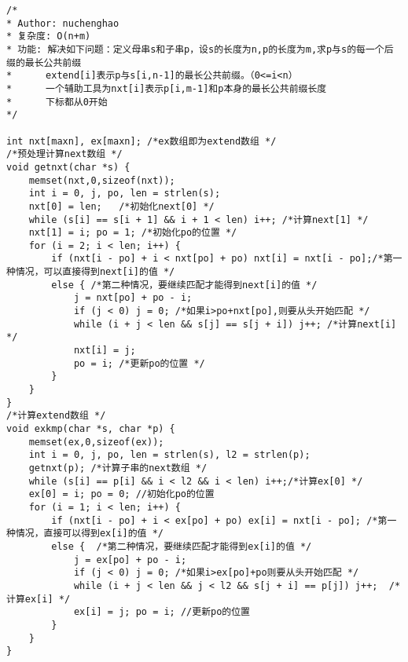 \begin{lstlisting}
/*
* Author: nuchenghao
* 复杂度: O(n+m)
* 功能: 解决如下问题：定义母串s和子串p，设s的长度为n,p的长度为m,求p与s的每一个后缀的最长公共前缀
*      extend[i]表示p与s[i,n-1]的最长公共前缀。（0<=i<n）
*      一个辅助工具为nxt[i]表示p[i,m-1]和p本身的最长公共前缀长度
*      下标都从0开始
*/

int nxt[maxn], ex[maxn]; /*ex数组即为extend数组 */
/*预处理计算next数组 */
void getnxt(char *s) {
	memset(nxt,0,sizeof(nxt));
	int i = 0, j, po, len = strlen(s);
	nxt[0] = len;   /*初始化next[0] */
	while (s[i] == s[i + 1] && i + 1 < len) i++; /*计算next[1] */
	nxt[1] = i; po = 1; /*初始化po的位置 */
	for (i = 2; i < len; i++) {
		if (nxt[i - po] + i < nxt[po] + po) nxt[i] = nxt[i - po];/*第一种情况，可以直接得到next[i]的值 */
		else { /*第二种情况，要继续匹配才能得到next[i]的值 */
			j = nxt[po] + po - i;
			if (j < 0) j = 0; /*如果i>po+nxt[po],则要从头开始匹配 */
			while (i + j < len && s[j] == s[j + i]) j++; /*计算next[i] */
			nxt[i] = j;
			po = i; /*更新po的位置 */
		}
	}
}
/*计算extend数组 */
void exkmp(char *s, char *p) {
	memset(ex,0,sizeof(ex));
	int i = 0, j, po, len = strlen(s), l2 = strlen(p);
	getnxt(p); /*计算子串的next数组 */
	while (s[i] == p[i] && i < l2 && i < len) i++;/*计算ex[0] */
	ex[0] = i; po = 0; //初始化po的位置
	for (i = 1; i < len; i++) {
		if (nxt[i - po] + i < ex[po] + po) ex[i] = nxt[i - po]; /*第一种情况，直接可以得到ex[i]的值 */
		else {  /*第二种情况，要继续匹配才能得到ex[i]的值 */
			j = ex[po] + po - i;
			if (j < 0) j = 0; /*如果i>ex[po]+po则要从头开始匹配 */
			while (i + j < len && j < l2 && s[j + i] == p[j]) j++;  /*计算ex[i] */
			ex[i] = j; po = i; //更新po的位置
		}
	}
}
\end{lstlisting}